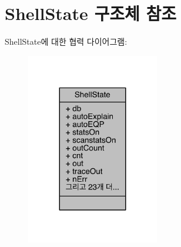 \hypertarget{struct_shell_state}{}\section{Shell\+State 구조체 참조}
\label{struct_shell_state}


Shell\+State에 대한 협력 다이어그램\+:
\nopagebreak
\begin{figure}[H]
\begin{center}
\leavevmode
\includegraphics[width=164pt]{d5/d8f/struct_shell_state__coll__graph}
\end{center}
\end{figure}
